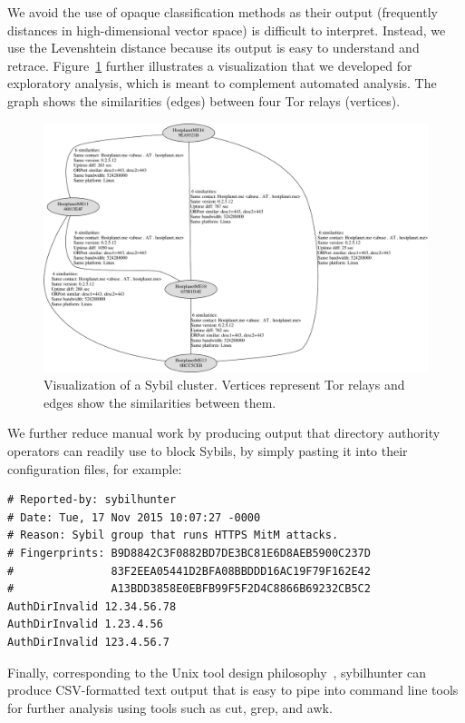 We avoid the use of opaque classification methods as their output (frequently
distances in high-dimensional vector space) is difficult to interpret.  Instead,
we use the Levenshtein distance because its output is easy to understand and
retrace.  Figure~\ref{fig:visualization} further illustrates a visualization
that we developed for exploratory analysis, which is meant to complement
automated analysis.  The graph shows the similarities (edges) between four Tor
relays (vertices).

\begin{figure}[t]
	\centering
	\includegraphics[width=\linewidth]{diagrams/visualization.pdf}
    \caption{Visualization of a Sybil cluster.  Vertices represent Tor relays
    and edges show the similarities between them.}
	\label{fig:visualization}
\end{figure}

We further reduce manual work by producing output that directory authority
operators can readily use to block Sybils, by simply pasting it into their
configuration files, for example:

{\footnotesize
\begin{verbatim}
# Reported-by: sybilhunter
# Date: Tue, 17 Nov 2015 10:07:27 -0000
# Reason: Sybil group that runs HTTPS MitM attacks.
# Fingerprints: B9D8842C3F0882BD7DE3BC81E6D8AEB5900C237D
#               83F2EEA05441D2BFA08BBDDD16AC19F79F162E42
#               A13BDD3858E0EBFB99F5F2D4C8866B69232CB5C2
AuthDirInvalid 12.34.56.78
AuthDirInvalid 1.23.4.56
AuthDirInvalid 123.4.56.7
\end{verbatim}
}

\noindent Finally, corresponding to the Unix tool design
philosophy~\cite{Pike1983a}, sybilhunter can produce CSV-formatted text output
that is easy to pipe into command line tools for further analysis using tools
such as cut, grep, and awk.


